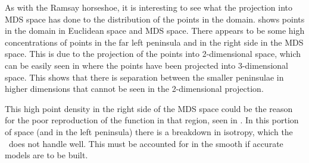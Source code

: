 
As with the Ramsay horseshoe, it is interesting to see what the projection into MDS space has done to the distribution of the points in the domain.  shows points in the domain in Euclidean space and MDS space. There appears to be some high concentrations of points in the far left peninsula and in the right side in the MDS space. This is due to the projection of the points into 2-dimensional space, which can be easily seen in  where the points have been projected into 3-dimensional space. This shows that there is separation between the smaller peninsulae in higher dimensions that cannot be seen in the 2-dimensional projection.

This high point density in the right side of the MDS space could be the reason for the poor reproduction of the function in that region, seen in . In this portion of space (and in the left peninsula) there is a breakdown in isotropy, which the \tprs\ does not handle well. This must be accounted for in the smooth if accurate models are to be built.

